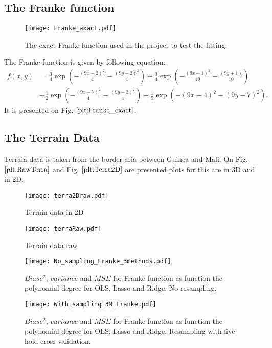 \documentclass[10pt]{article}
\begin{document}
\subsection{The Franke function}

\begin{figure}
	\centerline{\texttt{[image: Franke\_axact.pdf]}}
	\caption{The exact Franke function used in the project to test the fitting.}	\label{plt:Franke_exact}
\end{figure}

The Franke function is given by following equation:
\begin{align*}
f(x,y) &= \frac{3}{4}\exp{\left(-\frac{(9x-2)^2}{4} - \frac{(9y-2)^2}{4}\right)}+\frac{3}{4}\exp{\left(-\frac{(9x+1)^2}{49}- \frac{(9y+1)}{10}\right)} \\
&+\frac{1}{2}\exp{\left(-\frac{(9x-7)^2}{4} - \frac{(9y-3)^2}{4}\right)} -\frac{1}{5}\exp{\left(-(9x-4)^2 - (9y-7)^2\right)}.
\end{align*}
It is presented on Fig. $\ref{plt:Franke_exact}$. 


\subsection{The Terrain Data}
Terrain data is taken from the border aria between Guinea and Mali. On Fig. $\ref{plt:RawTerra}$ and Fig. $\ref{plt:Terra2D}$ are presented plots for this are in 3D and in 2D.
\begin{figure}
	\centerline{\texttt{[image: terra2Draw.pdf]}}
	\caption{Terrain data in 2D}\label{plt:Terra2D}
\end{figure}

\begin{figure}
	\centerline{\texttt{[image: terraRaw.pdf]}}
	\caption{Terrain data raw} \label{plt:RawTerra}
\end{figure}


\begin{figure}
	\centerline{\texttt{[image: No\_sampling\_Franke\_3methods.pdf]}}
	\caption{$Biase^2$, $variance$ and $MSE$ for Franke function as function the polynomial degree for OLS, Lasso and Ridge. No resampling.} \label{plt:no_sampling_Franke_3m_BVMSE}
\end{figure}


\begin{figure}
	\centerline{\texttt{[image: With\_sampling\_3M\_Franke.pdf]}}
	\caption{ $Biase^2$, $variance$ and $MSE$ for Franke function as function the polynomial degree for OLS, Lasso and Ridge. Resampling with five-hold cross-validation.} \label{plt:with_sampling_Franke_3m_BVMSE}
\end{figure}
\end{document}

